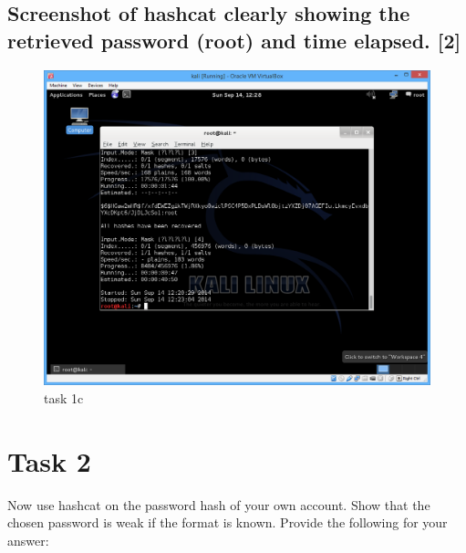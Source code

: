 \documentclass[11pt,titlepage]{article}
\begin{document}
\subsection{Screenshot  of  hashcat  clearly  showing  the  retrieved  password  (root)  and  time elapsed. [2]}

\begin{figure}[H]
\begin{center}
\includegraphics[scale=0.6]{task1c.png}
\caption{task 1c}
\end{center}
\end{figure}

\section{Task 2}
Now use hashcat on the password hash of your own account. Show that the chosen 
password is weak if the format is known. Provide the following for your answer:
\end{document}

